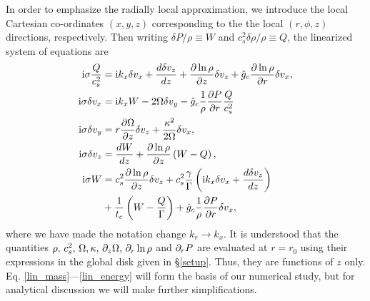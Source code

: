 In order to emphasize the radially local approximation, we
introduce the local Cartesian co-ordinates $(x,y,z)$ corresponding to
the the local $(r,\phi,z)$ directions, respectively. Then writing
$\delta P /\rho \equiv W$ and $c_s^2\delta\rho/\rho\equiv Q$, the
linearized system of equations are 
\begin{align}
  \mathrm{i}\sigma \frac{Q}{c_s^2}  &=  \mathrm{i} k_x \delta v_x + \frac{d\delta
    v_z}{dz} + \frac{\partial\ln{\rho}}{\partial z}\delta v_z + \hat{g}_c
  \frac{\partial\ln{\rho}}{\partial r} \delta v_x,\label{lin_mass}\\
  \mathrm{i}\sigma \delta v_x  &= \mathrm{i} k_x W - 2\Omega\delta v_y -
  \hat{g}_c\frac{1}{\rho}\frac{\partial P}{\partial r}\frac{Q}{c_s^2}\label{lin_vx}\\
   \mathrm{i} \sigma\delta v_y &= r\frac{\partial \Omega}{\partial z}\delta v_z +
  \frac{\kappa^2}{2\Omega}\delta v_x, \label{lin_vy}\\
   \mathrm{i}\sigma\delta v_z &= \frac{dW}{dz} +
  \frac{\partial\ln{\rho}}{\partial z}\left(W-Q\right), \label{lin_vz}\\
  \mathrm{i} \sigma W &= c_s^2\frac{\partial\ln{\rho}}{\partial z}\delta v_z +
  c_s^2\frac{\gamma}{\Gamma} \left(\mathrm{i} k_x\delta v_x + \frac{d\delta
      v_z}{dz}\right) \notag\\
  &+ \frac{1}{t_c}\left(W - \frac{Q}{\Gamma}\right) +
  \hat{g}_c\frac{1}{\rho}\frac{\partial P}{\partial r}\delta v_x,\label{lin_energy}
\end{align}
where we have made the notation change $k_r\to k_x$. 
It is understood that the quantities $\rho,\,c_s^2,\,\Omega,\kappa,\, 
\partial_z\Omega,\, \partial_r\ln{\rho} $ and $ \partial_r P$ are evaluated at $r=r_0$
using their expressions in the global disk given in \S\ref{setup}. Thus, they are functions of $z$ only. 
Eq. \ref{lin_mass}---\ref{lin_energy} will form the basis of our numerical
study, but for analytical discussion
we will make further simplifications. 
